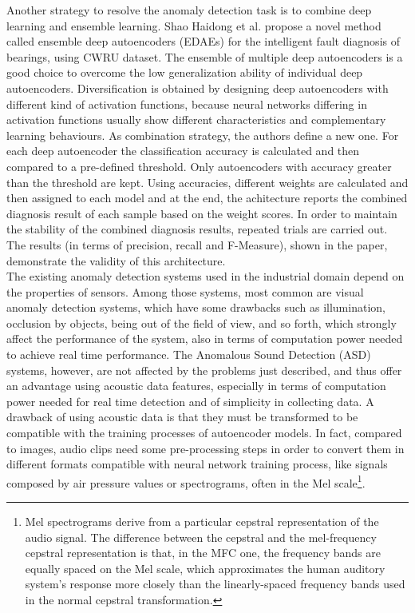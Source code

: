 Another strategy to resolve the anomaly detection task is to combine deep learning and ensemble learning. Shao Haidong et al. \cite{14NovelMethodEnsembleDeepAutoencoder} propose a novel method called ensemble deep autoencoders (EDAEs) for the intelligent fault diagnosis of bearings, using CWRU dataset. The ensemble of multiple deep autoencoders is a good choice to overcome the low generalization ability of individual deep autoencoders. Diversification is obtained by designing deep autoencoders with different kind of activation functions, because neural networks differing in activation functions usually show different characteristics and complementary learning behaviours. As combination strategy, the authors define a new one. For each deep autoencoder the classification accuracy is calculated and then compared to a pre-defined threshold. Only autoencoders with accuracy greater than the threshold are kept. Using accuracies, different weights are calculated and then assigned to each model and at the end, the achitecture reports the combined diagnosis result of each sample based on the weight scores. In order to maintain the stability of the combined diagnosis results, repeated trials are carried out. The results (in terms of precision, recall and F-Measure), shown in the paper, demonstrate the validity of this architecture.\\
The existing anomaly detection systems used in the industrial domain depend on the properties of sensors. Among those systems, most common are visual anomaly detection systems, which have some drawbacks such as illumination, occlusion by objects, being out of the field of view, and so forth, which strongly affect the performance of the system, also in terms of computation power needed to achieve real time performance. The Anomalous Sound Detection (ASD) systems, however, are not affected by the problems just described, and thus offer an advantage using acoustic data features, especially in terms of computation power needed for real time detection and of simplicity in collecting data. A drawback of using acoustic data is that they must be transformed to be compatible with the training processes of autoencoder models. In fact, compared to images, audio clips need some pre-processing steps in order to convert them in different formats compatible with neural network training process, like signals composed by air pressure values or spectrograms, often in the Mel scale\footnote{Mel spectrograms derive from a particular cepstral representation of the audio signal. The difference between the cepstral and the mel-frequency cepstral representation is that, in the MFC one, the frequency bands are equally spaced on the Mel scale, which approximates the human auditory system’s response more closely than the linearly-spaced frequency bands used in the normal cepstral transformation.}.\\
